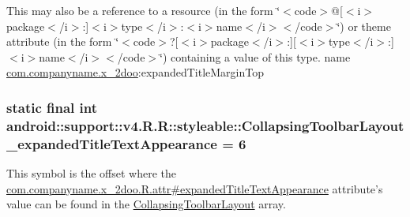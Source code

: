 This may also be a reference to a resource (in the form \char`\"{}$<$code$>$@\mbox{[}$<$i$>$package$<$/i$>$:\mbox{]}$<$i$>$type$<$/i$>$:$<$i$>$name$<$/i$>$$<$/code$>$\char`\"{}) or theme attribute (in the form \char`\"{}$<$code$>$?\mbox{[}$<$i$>$package$<$/i$>$:\mbox{]}\mbox{[}$<$i$>$type$<$/i$>$:\mbox{]}$<$i$>$name$<$/i$>$$<$/code$>$\char`\"{}) containing a value of this type.  name \hyperlink{namespacecom_1_1companyname_1_1x__2doo}{com.companyname.x\_\-2doo}:expandedTitleMarginTop \hypertarget{classandroid_1_1support_1_1v4_1_1_r_1_1styleable_28094fe9aadbf7fa99afd24d0f68a70e}{
\subsubsection[{CollapsingToolbarLayout\_\-expandedTitleTextAppearance}]{\setlength{\rightskip}{0pt plus 5cm}static final int android::support::v4.R.R::styleable::CollapsingToolbarLayout\_\-expandedTitleTextAppearance = 6}}
\label{classandroid_1_1support_1_1v4_1_1_r_1_1styleable_28094fe9aadbf7fa99afd24d0f68a70e}


This symbol is the offset where the \hyperlink{classcom_1_1companyname_1_1x__2doo_1_1_r_1_1attr_393be22751f73306c5ee586d2ab117dd}{com.companyname.x\_\-2doo.R.attr\#expandedTitleTextAppearance} attribute's value can be found in the \hyperlink{classandroid_1_1support_1_1v4_1_1_r_1_1styleable_aa101903fcf4b45a3b7fee0a0abc5ea8}{CollapsingToolbarLayout} array.

